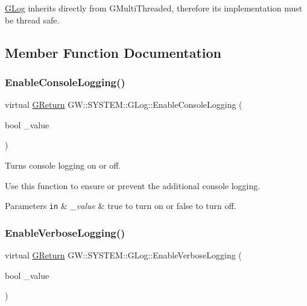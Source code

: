 \hyperlink{classGW_1_1SYSTEM_1_1GLog}{G\+Log} inherits directly from G\+Multi\+Threaded, therefore its implementation must be thread safe. 

\subsection{Member Function Documentation}
\mbox{\label{classGW_1_1SYSTEM_1_1GLog_a1eb651aa3d5b6b8baac389be284a569d}} 
\subsubsection{\texorpdfstring{Enable\+Console\+Logging()}{EnableConsoleLogging()}}
{\footnotesize\ttfamily virtual \hyperlink{namespaceGW_a67a839e3df7ea8a5c5686613a7a3de21}{G\+Return} G\+W\+::\+S\+Y\+S\+T\+E\+M\+::\+G\+Log\+::\+Enable\+Console\+Logging (\begin{DoxyParamCaption}\item[{bool}]{\+\_\+value }\end{DoxyParamCaption})\hspace{0.3cm}{\ttfamily [pure virtual]}}



Turns console logging on or off. 

Use this function to ensure or prevent the additional console logging.


\begin{DoxyParams}[1]{Parameters}
\mbox{\tt in}  & {\em \+\_\+value} & true to turn on or false to turn off. \\
\hline
\end{DoxyParams}
\mbox{\label{classGW_1_1SYSTEM_1_1GLog_adea469091bba33b419f7e88a9c2c3049}} 
\subsubsection{\texorpdfstring{Enable\+Verbose\+Logging()}{EnableVerboseLogging()}}
{\footnotesize\ttfamily virtual \hyperlink{namespaceGW_a67a839e3df7ea8a5c5686613a7a3de21}{G\+Return} G\+W\+::\+S\+Y\+S\+T\+E\+M\+::\+G\+Log\+::\+Enable\+Verbose\+Logging (\begin{DoxyParamCaption}\item[{bool}]{\+\_\+value }\end{DoxyParamCaption})\hspace{0.3cm}{\ttfamily [pure virtual]}}



